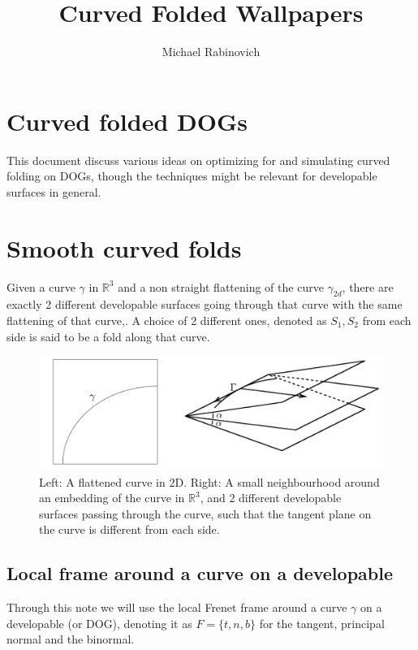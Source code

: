 \documentclass{article}
\title{Curved Folded Wallpapers}
\author[1]{Michael Rabinovich}
\theoremstyle{definition}
\begin{document}
\maketitle

\section{Curved folded DOGs}

This document discuss various ideas on optimizing for and simulating curved folding on DOGs, though the techniques might be relevant for developable surfaces in general.

\section{Smooth curved folds}
Given a curve $\gamma$ in $\mathbb{R}^3$ and a non straight flattening of the curve $\gamma_{2d}$, there are exactly 2 different developable surfaces going through that curve with the same flattening of that curve,. A choice of 2 different ones, denoted as $S_1,S_2$ from each side is said to be a fold along that curve.

\begin{figure} [h]
	\centering
	\includegraphics[width=0.7\linewidth]{curved_fold_through_curve.pdf}
	\caption{Left: A flattened curve in 2D. Right: A small neighbourhood around an embedding of the curve in $\mathbb{R}^3$, and 2 different developable surfaces passing through the curve, such that the tangent plane on the curve is different from each side.}
	\label{fig:curved_fold_through_curve}
\end{figure}

\subsection{Local frame around a curve on a developable}
Through this note we will use the local Frenet frame around a curve $\gamma$ on a developable (or DOG), denoting it as $F = \{t,n,b\}$ for the tangent, principal normal and the binormal.
	
\end{document}
